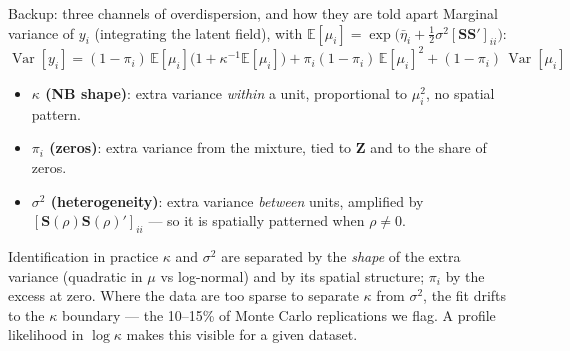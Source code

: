 \documentclass[10pt,aspectratio=169]{beamer}
\newcommand{\E}{\mathbb{E}}
\newcommand{\bZ}{\mathbf{Z}}
\newcommand{\bS}{\mathbf{S}}
\DeclareMathOperator{\Var}{Var}
\begin{document}
\begin{frame}{Backup: three channels of overdispersion, and how they are told apart}
  \small
  Marginal variance of $y_i$ (integrating the latent field), with $\E[\mu_i] = \exp\!\bigl(\bar\eta_i + \tfrac12\sigma^2[\bS\bS']_{ii}\bigr)$:
  \[
    \Var[y_i] = (1-\pi_i)\,\E[\mu_i]\bigl(1+\kappa^{-1}\E[\mu_i]\bigr) + \pi_i(1-\pi_i)\,\E[\mu_i]^2 + (1-\pi_i)\,\Var[\mu_i]
  \]
  \begin{itemize}\setlength{\itemsep}{0.4em}
    \item \textbf{$\kappa$ (NB shape)}: extra variance \emph{within} a unit, proportional to $\mu_i^2$, no spatial pattern.
    \item \textbf{$\pi_i$ (zeros)}: extra variance from the mixture, tied to $\bZ$ and to the share of zeros.
    \item \textbf{$\sigma^2$ (heterogeneity)}: extra variance \emph{between} units, amplified by $[\bS(\rho)\bS(\rho)']_{ii}$ --- so it is spatially patterned when $\rho\neq0$.
  \end{itemize}
  \vspace{0.4em}
  \begin{block}{Identification in practice}
    $\kappa$ and $\sigma^2$ are separated by the \emph{shape} of the extra variance (quadratic in $\mu$ vs log-normal) and by its spatial structure; $\pi_i$ by the excess at zero. Where the data are too sparse to separate $\kappa$ from $\sigma^2$, the fit drifts to the $\kappa$ boundary --- the 10--15\% of Monte Carlo replications we flag. A profile likelihood in $\log\kappa$ makes this visible for a given dataset.
  \end{block}
\end{frame}
\end{document}
